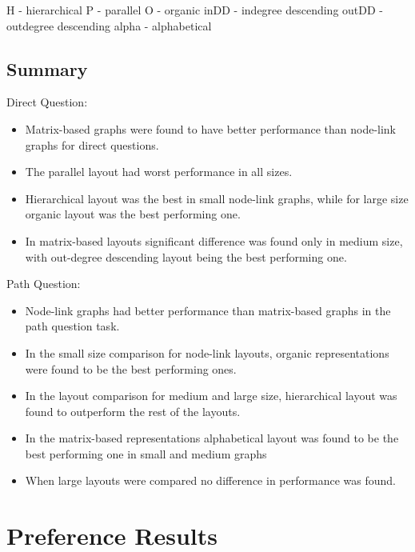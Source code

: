 \documentclass{l4proj}
\begin{document}
H - hierarchical P - parallel O - organic inDD - indegree descending outDD - outdegree descending alpha - alphabetical

\subsection{Summary}

Direct Question:
\begin{itemize}
	\item Matrix-based graphs were found to have better performance than node-link graphs for direct questions.
	\item The parallel layout had worst performance in all sizes.
	\item Hierarchical layout was the best in small node-link graphs, while for large size organic layout was the best performing one.
	\item In matrix-based layouts significant difference was found only in medium size, with out-degree descending layout being the best performing one.
\end{itemize}
Path Question:
\begin{itemize}
	\item Node-link graphs had better performance than matrix-based graphs in the path question task.
	\item In the small size comparison for node-link layouts, organic representations were found to be the best performing ones.
	\item In the layout comparison for medium and large size, hierarchical layout was found to outperform the rest of the layouts.
	\item In the matrix-based representations alphabetical layout was found to be the best performing one in small and medium graphs
	\item When large layouts were compared no difference in performance was found.
\end{itemize}


\section{Preference Results} 
\end{document}
